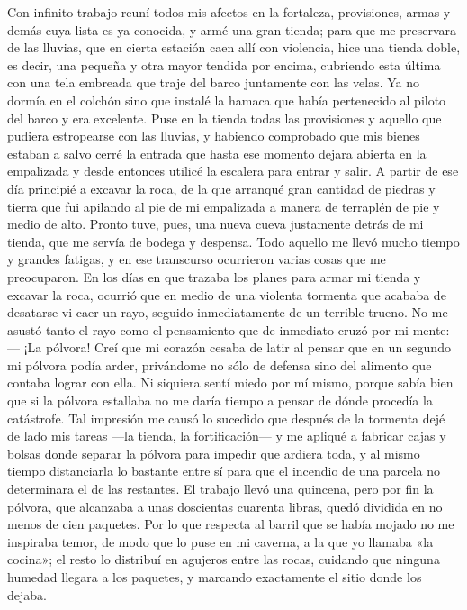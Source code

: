 \documentclass{novela}
\begin{document}
    Con infinito trabajo reuní todos mis afectos en la fortaleza, provisiones, armas y demás cuya lista es ya conocida, y armé una gran tienda; para que me preservara de las lluvias, que en cierta estación caen allí con violencia, hice una tienda doble, es decir, una pequeña y otra mayor tendida por encima, cubriendo esta última con una tela embreada que traje del barco juntamente con las velas. Ya no dormía en el colchón sino que instalé la hamaca que había pertenecido al piloto del barco y era excelente.
    Puse en la tienda todas las provisiones y aquello que pudiera estropearse con las lluvias, y habiendo comprobado que mis bienes estaban a salvo cerré la entrada que hasta ese momento dejara abierta en la empalizada y desde entonces utilicé la escalera para entrar y salir.
    A partir de ese día principié a excavar la roca, de la que arranqué gran cantidad de piedras y tierra que fui apilando al pie de mi empalizada a manera de terraplén de pie y medio de alto. Pronto tuve, pues, una nueva cueva justamente detrás de mi tienda, que me servía de bodega y despensa.
    Todo aquello me llevó mucho tiempo y grandes fatigas, y en ese transcurso ocurrieron varias cosas que me preocuparon. En los días en que trazaba los planes para armar mi tienda y excavar la roca, ocurrió que en medio de una violenta tormenta que acababa de desatarse vi caer un rayo, seguido inmediatamente de un terrible trueno. No me asustó tanto el rayo como el pensamiento que de inmediato cruzó por mi mente:
    — ¡La pólvora!
    Creí que mi corazón cesaba de latir al pensar que en un segundo mi pólvora podía arder, privándome no sólo de defensa sino del alimento que contaba lograr con ella. Ni siquiera sentí miedo por mí mismo, porque sabía bien que si la pólvora estallaba no me daría tiempo a pensar de dónde procedía la catástrofe.
    Tal impresión me causó lo sucedido que después de la tormenta dejé de lado mis tareas —la tienda, la fortificación— y me apliqué a fabricar cajas y bolsas donde separar la pólvora para impedir que ardiera toda, y al mismo tiempo distanciarla lo bastante entre sí para que el incendio de una parcela no determinara el de las restantes. El trabajo llevó una quincena, pero por fin la pólvora, que alcanzaba a unas doscientas cuarenta libras, quedó dividida en no menos de cien paquetes. Por lo que respecta al barril que se había mojado no me inspiraba temor, de modo que lo puse en mi caverna, a la que yo llamaba «la cocina»; el resto lo distribuí en agujeros entre las rocas, cuidando que ninguna humedad llegara a los paquetes, y marcando exactamente el sitio donde los dejaba.
\end{document}
